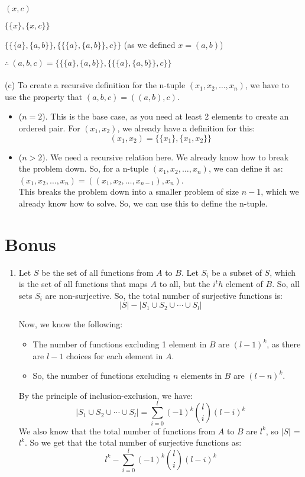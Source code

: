 \documentclass[a4paper]{article}
\begin{document}
\begin{enumerate}
\begin{sollist}
    \item $(x, c)$
    \item $\{\{x\}, \{x, c\}\}$
    \item $\{\{\{a\}, \{a, b\}\}, \{\{\{a\}, \{a, b\}\}, c\}\}$ (as we defined $x = (a, b)$)
\end{sollist}
$\therefore\ (a, b, c) = \{\{\{a\}, \{a, b\}\}, \{\{\{a\}, \{a, b\}\}, c\}\}$\\
\\
(c) To create a recursive definition for the n-tuple $(x_1, x_2, \ldots, x_n)$, we have to use the property that $(a, b, c) = ((a, b), c)$.
\begin{itemize}
    \item ($n = 2$). This is the base case, as you need at least 2 elements to create an ordered pair. For $(x_1, x_2)$, we already have a definition for this:\\
    $$(x_1, x_2) = \{\{x_1\}, \{x_1, x_2\}\}$$
    \item ($n > 2$). We need a recursive relation here. We already know how to break the problem down. So, for a n-tuple $(x_1, x_2, \ldots, x_n)$, we can define it as: $(x_1, x_2, \ldots, x_n) = ((x_1, x_2, \ldots, x_{n-1}), x_n)$.\\
    This breaks the problem down into a smaller problem of size $n-1$, which we already know how to solve. So, we can use this to define the n-tuple.
\end{itemize}
\end{enumerate}

\section{Bonus}
\begin{enumerate}
    \item Let $S$ be the set of all functions from $A$ to $B$. Let $S_i$ be a subset of $S$, which is the set of all functions that maps $A$ to all, but the $i^th$ element of $B$. So, all sets $S_i$ are non-surjective. So, the total number of surjective functions is:
    $$|S| - |S_1 \cup S_2 \cup \cdots \cup S_l|$$

    Now, we know the following:
    \begin{itemize}
        \item The number of functions excluding 1 element in $B$ are $(l-1)^k$, as there are $l-1$ choices for each element in $A$.
        \item So, the number of functions excluding $n$ elements in $B$ are $(l-n)^k$.
    \end{itemize}
    By the principle of inclusion-exclusion, we have:
    $$|S_1 \cup S_2 \cup \cdots \cup S_l| = \sum_{i=0}^{l}(-1)^k\binom{l}{i}(l-i)^k$$
    We also know that the total number of functions from $A$ to $B$ are $l^k$, so $|S|$ = $l^k$. So we get that the total number of surjective functions as:
    $$l^k - \sum_{i=0}^{l}(-1)^k\binom{l}{i}(l-i)^k$$
    
\end{enumerate}
\end{document}
